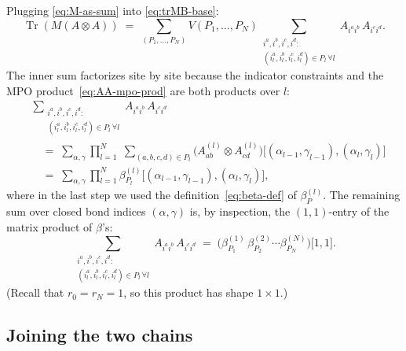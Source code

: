 \documentclass[11pt]{article}
\DeclareMathOperator{\Tr}{Tr}
\begin{document}
Plugging \eqref{eq:M-as-sum} into \eqref{eq:trMB-base}:
\[
\Tr(M(A\otimes A))
\;=\;
\sum_{(P_1,\dots,P_N)}
V(P_1,\dots,P_N)
\sum_{\substack{i^a,i^b,i^c,i^d:\\ (i^a_l,i^b_l,i^c_l,i^d_l)\in P_l\,\forall l}}
A_{i^a i^b}\,A_{i^c i^d}.
\]
The inner sum factorizes site by site because the indicator constraints and
the MPO product~\eqref{eq:AA-mpo-prod} are both products over $l$:
\begin{align*}
&\sum_{\substack{i^a,i^b,i^c,i^d:\\ (i^a_l,i^b_l,i^c_l,i^d_l)\in P_l\,\forall l}}
A_{i^a i^b}\,A_{i^c i^d} \\
&\quad=\;
\sum_{\alpha,\gamma}
\prod_{l=1}^N\;
\sum_{(a,b,c,d)\in P_l}
\bigl(A^{(l)}_{ab}\otimes A^{(l)}_{cd}\bigr)\!
\bigl[(\alpha_{l-1},\gamma_{l-1}),(\alpha_l,\gamma_l)\bigr] \\
&\quad=\;
\sum_{\alpha,\gamma}
\prod_{l=1}^N \beta_{P_l}^{(l)}\bigl[(\alpha_{l-1},\gamma_{l-1}),(\alpha_l,\gamma_l)\bigr],
\end{align*}
where in the last step we used the definition~\eqref{eq:beta-def} of
$\beta_P^{(l)}$. The remaining sum over closed bond indices
$(\alpha,\gamma)$ is, by inspection, the $(1,1)$-entry of the matrix product
of $\beta$'s:
\begin{equation}\label{eq:beta-trace}
\sum_{\substack{i^a,i^b,i^c,i^d:\\ (i^a_l,i^b_l,i^c_l,i^d_l)\in P_l\,\forall l}}
A_{i^a i^b}\,A_{i^c i^d}
\;=\;
\bigl(\beta_{P_1}^{(1)}\,\beta_{P_2}^{(2)}\cdots\beta_{P_N}^{(N)}\bigr)\!\bigl[1,1\bigr].
\end{equation}
(Recall that $r_0 = r_N = 1$, so this product has shape $1\times 1$.)

\subsection{Joining the two chains}
\end{document}
